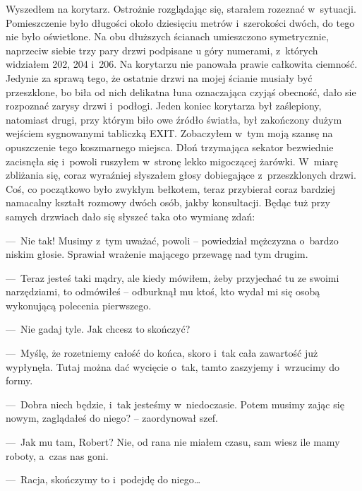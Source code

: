 Wyszedłem na korytarz. Ostrożnie rozglądając się, starałem rozeznać w~sytuacji. Pomieszczenie było długości około dziesięciu metrów i~szerokości dwóch, do tego nie było oświetlone. Na obu dłuższych ścianach umieszczono symetrycznie, naprzeciw siebie trzy pary drzwi podpisane u góry numerami, z~których widziałem 202, 204 i~206. Na korytarzu nie panowała prawie całkowita ciemność. Jedynie za sprawą tego, że ostatnie drzwi na mojej ścianie musiały być przeszklone, bo biła od nich delikatna łuna oznaczająca czyjąś obecność, dało sie rozpoznać zarysy drzwi i~podłogi.  Jeden koniec korytarza był zaślepiony, natomiast drugi, przy którym biło owe źródło światła, był zakończony dużym wejściem sygnowanymi tabliczką EXIT. Zobaczyłem w~tym moją szansę na opuszczenie tego koszmarnego miejsca. Dłoń trzymająca sekator bezwiednie zacisnęła się i~powoli ruszyłem w~stronę lekko migoczącej żarówki. W~miarę zbliżania się, coraz wyraźniej słyszałem głosy dobiegające z~przeszklonych drzwi. Coś, co początkowo było zwykłym bełkotem, teraz przybierał coraz bardziej namacalny kształt rozmowy dwóch osób, jakby konsultacji. Będąc tuż przy samych drzwiach dało się słyszeć taka oto wymianę zdań:

---~Nie tak! Musimy z~tym uważać, powoli -- powiedział mężczyzna o~bardzo niskim głosie. Sprawiał wrażenie mającego przewagę nad tym drugim. 

---~Teraz jesteś taki mądry, ale kiedy mówiłem, żeby przyjechać tu ze swoimi narzędziami, to odmówiłeś -- odburknął mu ktoś, kto wydał mi się osobą wykonującą polecenia pierwszego. 

---~Nie gadaj tyle. Jak chcesz to skończyć? 

---~Myślę, że rozetniemy całość do końca, skoro i~tak cała zawartość już wypłynęła. Tutaj można dać wycięcie o~tak, tamto zaszyjemy i~wrzucimy do formy. 

---~Dobra niech będzie, i~tak jesteśmy w~niedoczasie. Potem musimy zając się nowym, zaglądałeś do niego? -- zaordynował szef.

---~Jak mu tam, Robert? Nie, od rana nie miałem czasu, sam wiesz ile mamy roboty, a~czas nas goni. 

---~Racja, skończymy to i~podejdę do niego… 


